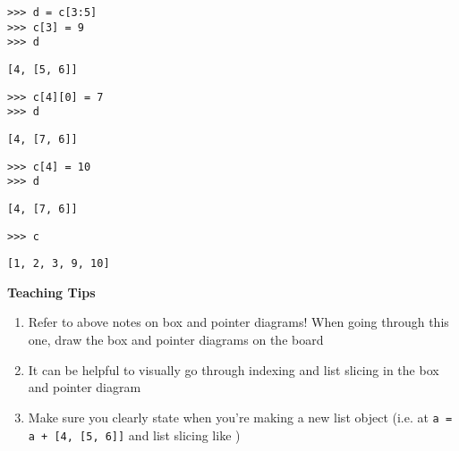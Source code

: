 \begin{blocksection}

\begin{lstlisting}
>>> d = c[3:5]
>>> c[3] = 9
>>> d

\end{lstlisting}
\begin{solution}[.25in]
\begin{lstlisting}
[4, [5, 6]]
\end{lstlisting}
\end{solution}

\begin{lstlisting}
>>> c[4][0] = 7
>>> d
\end{lstlisting}
\begin{solution}[.25in]
\begin{lstlisting}
[4, [7, 6]]
\end{lstlisting}
\end{solution}

\begin{lstlisting}
>>> c[4] = 10
>>> d
\end{lstlisting}
\begin{solution}[.25in]
\begin{lstlisting}
[4, [7, 6]]
\end{lstlisting}
\end{solution}

\begin{lstlisting}
>>> c
\end{lstlisting}
\begin{solution}[.25in]
\begin{lstlisting}
[1, 2, 3, 9, 10]
\end{lstlisting}
\end{solution}

\end{blocksection}

\begin{blocksection}
	\begin{guide}
	\textbf{Teaching Tips}
	\begin{enumerate}
			\item Refer to above notes on box and pointer diagrams! When going through this one, draw the box and pointer diagrams on the board
            \item It can be helpful to visually go through indexing and list slicing in the box and pointer diagram
            \item Make sure you clearly state when you’re making a new list object (i.e. at \texttt{a = a + [4, [5, 6]]} and list slicing like )
	\end{enumerate}
	\end{guide}
\end{blocksection}
